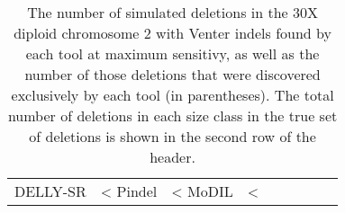 \begin{table}[t]
\begin{center}
\begin{tabular}{rrrr|rrrrr}
  DELLY-SR           & <%
  Pindel           & <%
  MoDIL           & <%
   \hline
\end{tabular}
\end{center}
\caption{The number of simulated deletions in the 30X diploid chromosome 2 with Venter indels found by each tool at maximum sensitivy, as well as the number of those deletions that were discovered exclusively by each tool (in parentheses). The total number of deletions in each size class in the true set of deletions is shown in the second row of the header.}
\label{chr2DeletionPredsMaxSensitivity}
\end{table}
